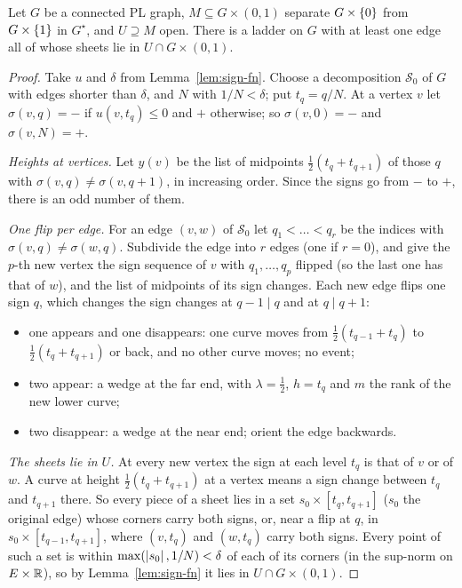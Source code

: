 
\begin{theorem}\label{thm:exists-ladder}
Let $G$ be a connected PL graph, $M\subseteq G\times(0,1)$ separate $G\times\left\{ 0 \right\}$ from $G\times\left\{ 1 \right\}$ in $G^\star$, and $U\supseteq M$ open. There is a ladder on $G$ with at least one edge all of
whose sheets lie in $U\cap G\times(0,1)$.
\end{theorem}

\begin{proof}
Take $u$ and $\delta$ from Lemma~\ref{lem:sign-fn}. Choose a decomposition $\mathcal S_0$ of $G$ with edges shorter than $\delta$, and $N$ with $1/N<\delta$; put $t_q=q/N$. At a vertex $v$ let
$\sigma(v,q)=-$ if $u(v,t_q)\le0$ and $+$ otherwise; so $\sigma(v,0)=-$ and $\sigma(v,N)=+$.

\emph{Heights at vertices.} Let $y(v)$ be the list of midpoints $\frac12(t_q+t_{q+1})$ of those $q$ with $\sigma(v,q)\neq\sigma(v,q+1)$, in increasing order. Since the signs go from $-$ to $+$, there is an
odd number of them.

\emph{One flip per edge.} For an edge $(v,w)$ of $\mathcal S_0$ let $q_1<\dots<q_r$ be the indices with $\sigma(v,q)\neq\sigma(w,q)$. Subdivide the edge into $r$ edges (one if $r=0$), and give the $p$-th new
vertex the sign sequence of $v$ with $q_1,\dots,q_p$ flipped (so the last one has that of $w$), and the list of midpoints of its sign changes. Each new edge flips one sign $q$, which changes the
sign changes at $q-1\mid q$ and at $q\mid q+1$:
\begin{itemize}
\item one appears and one disappears: one curve moves from $\frac12(t_{q-1}+t_q)$ to $\frac12(t_q+t_{q+1})$ or back, and no other curve moves; no event;
\item two appear: a wedge at the far end, with $\lambda=\frac12$, $h=t_q$ and $m$ the rank of the new lower curve;
\item two disappear: a wedge at the near end; orient the edge backwards.
\end{itemize}

\emph{The sheets lie in $U$.} At every new vertex the sign at each level $t_q$ is that of $v$ or of $w$. A curve at height $\frac12(t_q+t_{q+1})$ at a vertex means a sign change between $t_q$ and $t_{q+1}$
there. So every piece of a sheet lies in a set $s_0\times[t_q,t_{q+1}]$ ($s_0$ the original edge) whose corners carry both signs, or, near a flip at $q$, in $s_0\times[t_{q-1},t_{q+1}]$, where
$(v,t_q)$ and $(w,t_q)$ carry both signs. Every point of such a set is within $\max(\left\lvert s_0\right\rvert,1/N)<\delta$ of each of its corners (in the sup-norm on $E\times\mathbb{R}$), so by Lemma~\ref{lem:sign-fn} it lies in
$U\cap G\times(0,1)$.
\end{proof}

